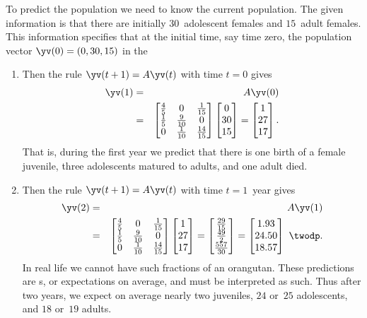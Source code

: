 \begin{example}[orangutans]
\begin{solution}
To predict the population we need to know the current population.
The given information is that there are initially \(30\)~adolescent females and \(15\)~adult females. 
This information specifies that at the initial time, say time zero, the population vector \(\yv(0)=(0,30,15)\) in the 
\begin{enumerate}
\item Then the rule \(\yv(t+1)=A\yv(t)\) with time \(t=0\) gives
\begin{eqnarray*}
\yv(1)&=&A\yv(0)
\\&=&\begin{bmatrix} \frac45&0&\frac1{15}
\\\frac15&\frac9{10}&0
\\0&\frac1{10}&\frac{14}{15} \end{bmatrix}\begin{bmatrix} 0\\30\\15 \end{bmatrix}
=\begin{bmatrix} 1\\27\\17 \end{bmatrix}.
\end{eqnarray*}
That is, during the first year we predict that there is one birth of a female juvenile, three adolescents matured to adults, and one adult died. 

\item Then the rule \(\yv(t+1)=A\yv(t)\) with time \(t=1\)~year gives
\begin{eqnarray*}
\yv(2)&=&A\yv(1)
\\&=&\begin{bmatrix} \frac45&0&\frac1{15}
\\\frac15&\frac9{10}&0
\\0&\frac1{10}&\frac{14}{15} \end{bmatrix}\begin{bmatrix} 1\\27\\17 \end{bmatrix}
=\begin{bmatrix} \frac{29}{15}\\\frac{49}2\\\frac{557}{30} \end{bmatrix}=\begin{bmatrix} 1.93\\24.50\\18.57 \end{bmatrix}\ \twodp.
\end{eqnarray*}
In real life we cannot have such fractions of an orangutan.
These predictions are s, or expectations on average, and must be interpreted as such. 
Thus after two years, we expect on average nearly two juveniles, \(24\) or~\(25\) adolescents, and \(18\) or~\(19\) adults.


\end{enumerate}
\end{solution}
\end{example}
